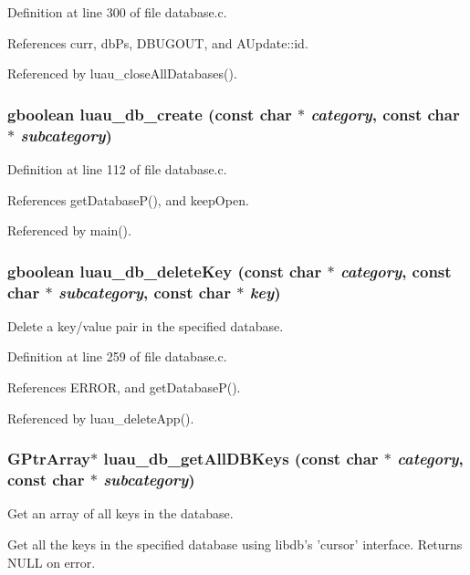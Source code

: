 Definition at line 300 of file database.c.

References curr, db\-Ps, DBUGOUT, and AUpdate::id.

Referenced by luau\_\-close\-All\-Databases().
\subsubsection{\setlength{\rightskip}{0pt plus 5cm}gboolean luau\_\-db\_\-create (const char $\ast$ {\em category}, const char $\ast$ {\em subcategory})}\label{database_8c_a6}




Definition at line 112 of file database.c.

References get\-Database\-P(), and keep\-Open.

Referenced by main().
\subsubsection{\setlength{\rightskip}{0pt plus 5cm}gboolean luau\_\-db\_\-delete\-Key (const char $\ast$ {\em category}, const char $\ast$ {\em subcategory}, const char $\ast$ {\em key})}\label{database_8c_a11}


Delete a key/value pair in the specified database. 



Definition at line 259 of file database.c.

References ERROR, and get\-Database\-P().

Referenced by luau\_\-delete\-App().
\subsubsection{\setlength{\rightskip}{0pt plus 5cm}GPtr\-Array$\ast$ luau\_\-db\_\-get\-All\-DBKeys (const char $\ast$ {\em category}, const char $\ast$ {\em subcategory})}\label{database_8c_a7}


Get an array of all keys in the database. 

Get all the keys in the specified database using libdb's 'cursor' interface. Returns NULL on error.

